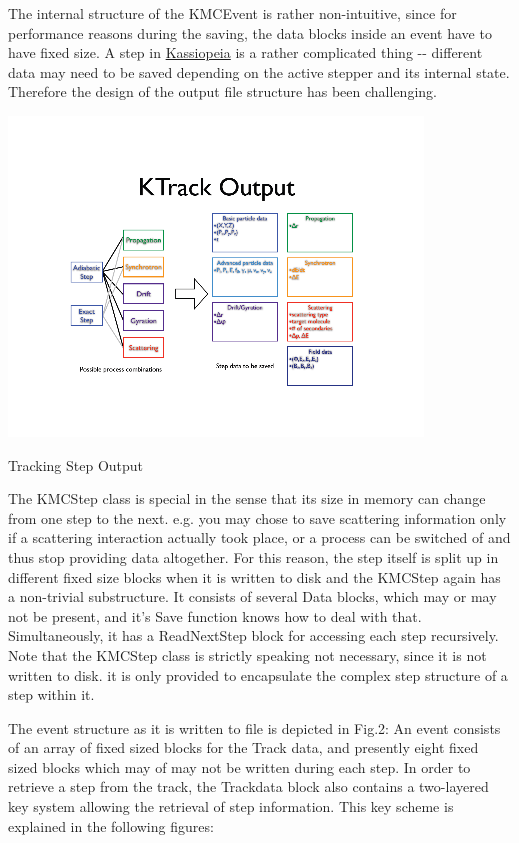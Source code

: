 The internal structure of the KMCEvent is rather non-\/intuitive, since for performance reasons during the saving, the data blocks inside an event have to have fixed size. A step in \hyperlink{class_kassiopeia}{Kassiopeia} is a rather complicated thing -\/-\/ different data may need to be saved depending on the active stepper and its internal state. Therefore the design of the output file structure has been challenging.


\begin{DoxyImage}
\includegraphics[width=\textwidth]{images/Output_fig1}
\caption{Tracking Step Output}
\end{DoxyImage}
 

The KMCStep class is special in the sense that its size in memory can change from one step to the next. e.g. you may chose to save scattering information only if a scattering interaction actually took place, or a process can be switched of and thus stop providing data altogether. For this reason, the step itself is split up in different fixed size blocks when it is written to disk and the KMCStep again has a non-\/trivial substructure. It consists of several Data blocks, which may or may not be present, and it's Save function knows how to deal with that. Simultaneously, it has a ReadNextStep block for accessing each step recursively. Note that the KMCStep class is strictly speaking not necessary, since it is not written to disk. it is only provided to encapsulate the complex step structure of a step within it.

The event structure as it is written to file is depicted in Fig.2: An event consists of an array of fixed sized blocks for the Track data, and presently eight fixed sized blocks which may of may not be written during each step. In order to retrieve a step from the track, the Trackdata block also contains a two-\/layered key system allowing the retrieval of step information. This key scheme is explained in the following figures:


